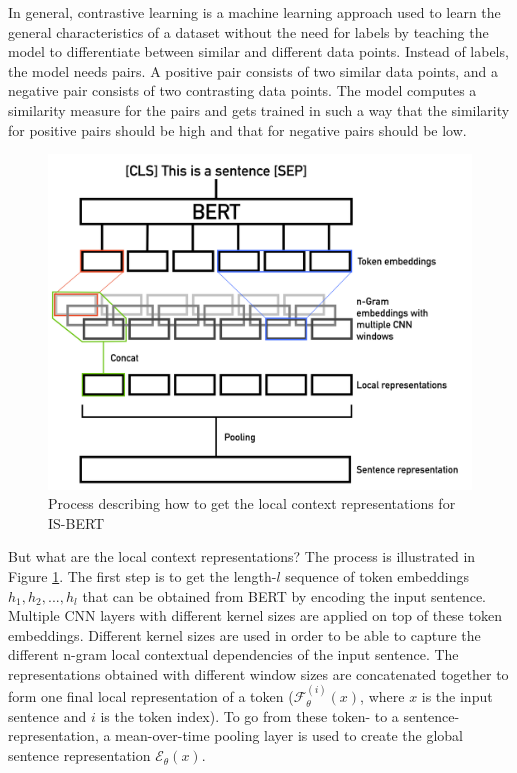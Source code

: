 In general, contrastive learning is a machine learning approach used to learn the general characteristics of a dataset without the need for labels by teaching the model to differentiate between similar and different data points. Instead of labels, the model needs pairs. A positive pair consists of two similar data points, and a negative pair consists of two contrasting data points. The model computes a similarity measure for the pairs and gets trained in such a way that the similarity for positive pairs should be high and that for negative pairs should be low.

\begin{figure}[h!]
\centering
\includegraphics[width = 0.9\linewidth]{figures/IS-BERT1.png}
\caption{Process describing how to get the local context representations for IS-BERT}
\label{fig:local_context}
\end{figure}

But what are the local context representations? The process is illustrated in Figure \ref{fig:local_context}. The first step is to get the length-$l$ sequence of token embeddings $h_1, h_2, ..., h_l$ that can be obtained from BERT by encoding the input sentence. Multiple CNN layers with different kernel sizes are applied on top of these token embeddings. Different kernel sizes are used in order to be able to capture the different n-gram local contextual dependencies of the input sentence. The representations obtained with different window sizes are concatenated together to form one final local representation of a token ($\mathcal{F}^{(i)}_\theta(x)$, where $x$ is the input sentence and $i$ is the token index). To go from these token- to a sentence-representation, a mean-over-time pooling layer is used to create the global sentence representation $\mathcal{E}_\theta (x)$.

